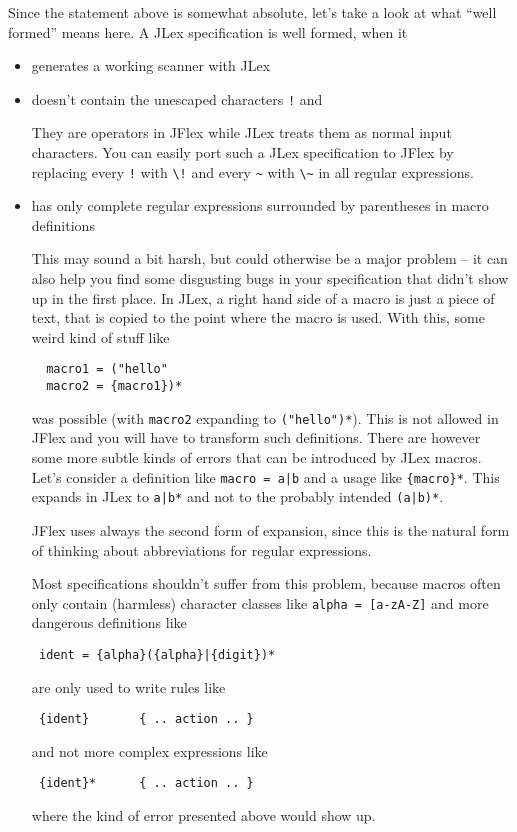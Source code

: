 \documentclass[11pt]{scrartcl}
\begin{document}
Since the statement above is somewhat absolute, let's take a look at
what ``well formed'' means here. A JLex specification is well formed, when
it
\begin{itemize}
\item
  generates a working scanner with JLex

\item 
  doesn't contain the unescaped characters \texttt{!} and \texttt{}

  They are operators in JFlex while JLex treats them as normal
  input characters. You can easily port such a JLex specification
  to JFlex by replacing every \texttt{!} with \verb+\!+ and every
  \verb+~+ with \verb+\~+ in all regular expressions.

\item
  has only complete regular expressions surrounded by parentheses in
  macro definitions
  
  This may sound a bit harsh, but could otherwise be a major problem
  -- it can also help you find some disgusting bugs in your
  specification that didn't show up in the first place. In JLex, a
  right hand side of a macro is just a piece of text, that is copied
  to the point where the macro is used. With this, some weird kind of
  stuff like
  \begin{verbatim}
  macro1 = ("hello"
  macro2 = {macro1})*
  \end{verbatim}  
  was possible (with \texttt{macro2} expanding to \verb+("hello")*+).  This
  is not allowed in JFlex and you will have to transform such
  definitions. There are however some more subtle kinds of errors that
  can be introduced by JLex macros. Let's consider a definition like
  \verb+macro = a|b+  and a usage like \verb+{macro}*+.
  This expands in JLex to \verb+a|b*+ and not to the probably intended
  \verb+(a|b)*+.

  JFlex uses always the second form of expansion, since this is the natural
  form of thinking about abbreviations for regular expressions.

  Most specifications shouldn't suffer from this problem, because
  macros often only contain (harmless) character classes like
  \texttt{alpha = [a-zA-Z]} and more dangerous definitions like

  \verb+ ident = {alpha}({alpha}|{digit})*+

  are only used to write rules like

  \verb+ {ident}       { .. action .. }+

  and not more complex expressions like

  \verb+ {ident}*      { .. action .. }+

  where the kind of error presented above would show up.
\end{itemize}
\end{document}
